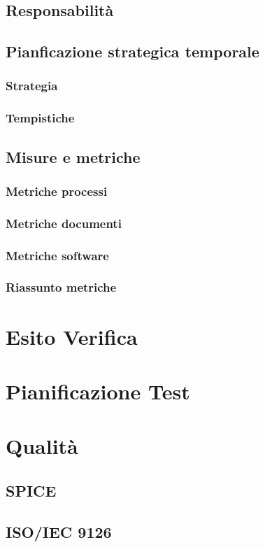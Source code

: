 \documentclass[a4paper, oneside, openany, dvipsnames, table]{article}
\begin{document}
	\subsection{Responsabilità}
		
	\subsection{Pianficazione strategica temporale}
		\subsubsection{Strategia}
			
		\subsubsection{Tempistiche}
			
	\subsection{Misure e metriche}
	\label{sec:metriche}
		
		\subsubsection{Metriche processi}
			
		\subsubsection{Metriche documenti}
			
		\subsubsection{Metriche software}
			
		\subsubsection{Riassunto metriche}
			


\appendix
{}

\newpage
\section{Esito Verifica}
	\label{app:misure}
	
\newpage
\section{Pianificazione Test}
	\label{app:misure}
	
	
\newpage
\section{Qualità}
	\subsection{SPICE}
		\label{app:SPICE}
		
	\subsection{ISO/IEC 9126}
		\label{app:ISO/IEC 9126}
		
\end{document}
